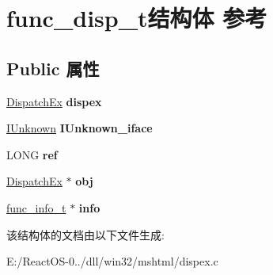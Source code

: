 \hypertarget{structfunc__disp__t}{}\section{func\+\_\+disp\+\_\+t结构体 参考}
\label{structfunc__disp__t}
\subsection*{Public 属性}
\begin{DoxyCompactItemize}
\item 
\mbox{\label{structfunc__disp__t_a5a7afad60570f9c9ecfc45ed357650b0}} 
\hyperlink{struct_dispatch_ex}{Dispatch\+Ex} {\bfseries dispex}
\item 
\mbox{\label{structfunc__disp__t_aed8289c1a2a85a1dd2b6ad403987c6ae}} 
\hyperlink{interface_i_unknown}{I\+Unknown} {\bfseries I\+Unknown\+\_\+iface}
\item 
\mbox{\label{structfunc__disp__t_a61b47f464d440891ce9b2b89373f0ded}} 
L\+O\+NG {\bfseries ref}
\item 
\mbox{\label{structfunc__disp__t_a9025acad1e00d891d000f9c19770498e}} 
\hyperlink{struct_dispatch_ex}{Dispatch\+Ex} $\ast$ {\bfseries obj}
\item 
\mbox{\label{structfunc__disp__t_a36a473adf80ab889073231023e254872}} 
\hyperlink{structfunc__info__t}{func\+\_\+info\+\_\+t} $\ast$ {\bfseries info}
\end{DoxyCompactItemize}


该结构体的文档由以下文件生成\+:\begin{DoxyCompactItemize}
\item 
E\+:/\+React\+O\+S-\/0../dll/win32/mshtml/dispex.\+c\end{DoxyCompactItemize}
